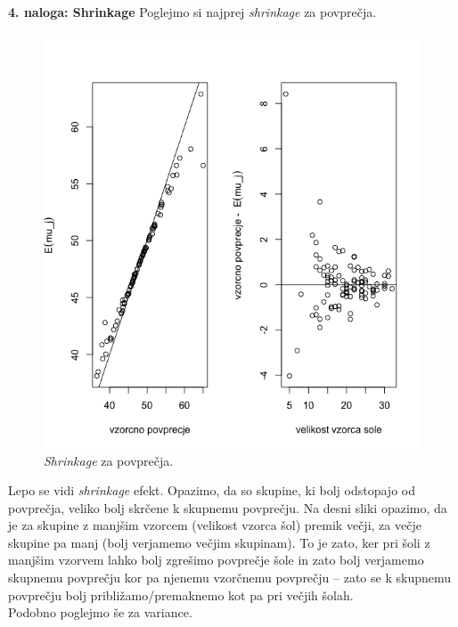 \documentclass[a4paper,11pt]{article}
\begin{document}
\\
\\
\noindent
\textbf{4. naloga: Shrinkage}
Poglejmo si najprej \textit{shrinkage} za povprečja.
\begin{figure}[ht!]
    \centering
    \includegraphics[width = 150mm]{Slike/4_povpr.png}
    \caption{\textit{Shrinkage} za povprečja.}
\end{figure}

\noindent
Lepo se vidi \textit{shrinkage} efekt. 
Opazimo, da so skupine, ki bolj odstopajo od povprečja, veliko bolj skrčene k skupnemu povprečju.
Na desni sliki opazimo, da je za skupine z manjšim vzorcem (velikost vzorca šol) premik večji, za večje skupine pa manj (bolj verjamemo večjim skupinam).
To je zato, ker pri šoli z manjšim vzorvem lahko bolj zgrešimo povprečje šole in zato bolj verjamemo skupnemu povprečju kor pa njenemu vzorčnemu povprečju -- zato se k skupnemu povprečju bolj približamo/premaknemo kot pa pri večjih šolah.
\\
Podobno poglejmo še za variance.
\end{document}
